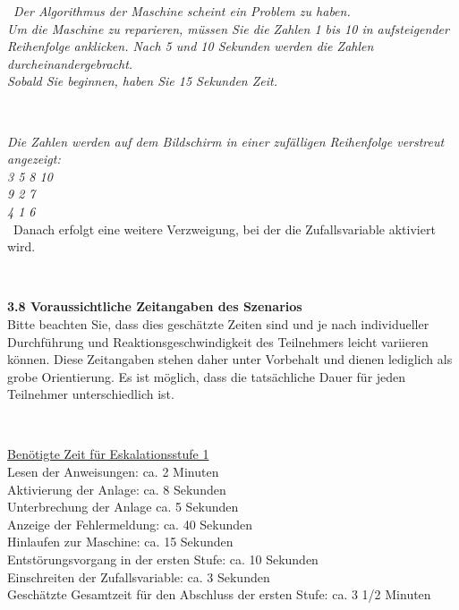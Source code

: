 {\
\emph{Der Algorithmus der Maschine scheint ein Problem zu haben. \\
Um die Maschine zu reparieren, müssen Sie die Zahlen 1 bis 10 in aufsteigender Reihenfolge anklicken.
Nach 5 und 10 Sekunden werden die Zahlen durcheinandergebracht. \\
Sobald Sie beginnen, haben Sie 15 Sekunden Zeit.}

\

\emph{Die Zahlen werden auf dem Bildschirm in einer zufälligen Reihenfolge verstreut angezeigt:} \\
\emph{3\hspace{15pt} 5\hspace{42pt} 8\hspace{58pt} 10\hspace{75pt} \\9\hspace{25pt} 2\hspace{37pt} 7\hspace{83pt} \\4\hspace{39pt} 1\hspace{66pt} 6\hspace{81pt}} \\

\
Danach erfolgt eine weitere Verzweigung, bei der die Zufallsvariable aktiviert wird.

\

\textbf{3.8 Voraussichtliche Zeitangaben des Szenarios}\\
Bitte beachten Sie, dass dies geschätzte Zeiten sind und je nach individueller Durchführung und Reaktionsgeschwindigkeit des Teilnehmers leicht variieren können. Diese Zeitangaben stehen daher unter Vorbehalt und dienen lediglich als grobe Orientierung. Es ist möglich, dass die tatsächliche Dauer für jeden Teilnehmer unterschiedlich ist.

\

\underline{Benötigte Zeit für Eskalationsstufe 1} \\
Lesen der Anweisungen: ca. 2 Minuten \\
Aktivierung der Anlage: ca. 8 Sekunden \\
Unterbrechung der Anlage ca. 5 Sekunden \\
Anzeige der Fehlermeldung: ca. 40 Sekunden \\
Hinlaufen zur Maschine: ca. 15 Sekunden \\
Entstörungsvorgang in der ersten Stufe: ca. 10 Sekunden \\
Einschreiten der Zufallsvariable: ca. 3 Sekunden \\
Geschätzte Gesamtzeit für den Abschluss der ersten Stufe: ca. 3 1/2 Minuten \\

}
